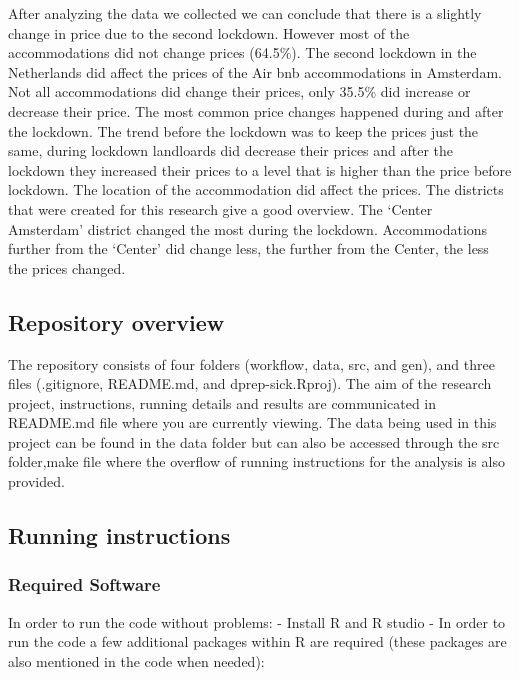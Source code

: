 \documentclass[
]{article}
\begin{document}
After analyzing the data we collected we can conclude that there is a
slightly change in price due to the second lockdown. However most of the
accommodations did not change prices (64.5\%). The second lockdown in
the Netherlands did affect the prices of the Air bnb accommodations in
Amsterdam. Not all accommodations did change their prices, only 35.5\%
did increase or decrease their price. The most common price changes
happened during and after the lockdown. The trend before the lockdown
was to keep the prices just the same, during lockdown landloards did
decrease their prices and after the lockdown they increased their prices
to a level that is higher than the price before lockdown. The location
of the accommodation did affect the prices. The districts that were
created for this research give a good overview. The `Center Amsterdam'
district changed the most during the lockdown. Accommodations further
from the `Center' did change less, the further from the Center, the less
the prices changed.

\hypertarget{repository-overview}{%
\subsection{Repository overview}\label{repository-overview}}

The repository consists of four folders (workflow, data, src, and gen),
and three files (.gitignore, README.md, and dprep-sick.Rproj). The aim
of the research project, instructions, running details and results are
communicated in README.md file where you are currently viewing. The data
being used in this project can be found in the data folder but can also
be accessed through the src folder,make file where the overflow of
running instructions for the analysis is also provided.

\hypertarget{running-instructions}{%
\subsection{Running instructions}\label{running-instructions}}

\hypertarget{required-software}{%
\subsubsection{Required Software}\label{required-software}}

In order to run the code without problems: - Install R and R studio - In
order to run the code a few additional packages within R are required
(these packages are also mentioned in the code when needed):
\end{document}
